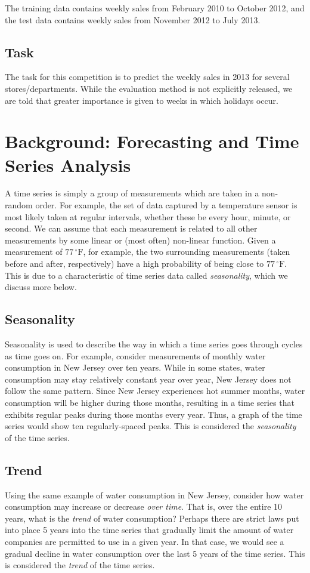 \documentclass{article}
\begin{document}
The training data contains weekly sales from February 2010 to October 2012, and the test data contains weekly sales from November 2012 to July 2013. 

\subsection{Task}
The task for this competition is to predict the weekly sales in 2013 for several stores/departments. While the evaluation method is not explicitly released, we are told that greater importance is given to weeks in which holidays occur.

\section{Background: Forecasting and Time Series Analysis}

A time series is simply a group of measurements which are taken in a non-random order. For example, the set of data captured by a temperature sensor is most likely taken at regular intervals, whether these be every hour, minute, or second. We can assume that each measurement is related to all other measurements by some linear or (most often) non-linear function. Given a measurement of $77\,^{\circ}\mathrm{F}$, for example, the two surrounding measurements (taken before and after, respectively) have a high probability of being close to $77\,^{\circ}\mathrm{F}$. This is due to a characteristic of time series data called \emph{seasonality}, which we discuss more below.

\subsection{Seasonality}
Seasonality is used to describe the way in which a time series goes through cycles as time goes on. For example, consider measurements of monthly water consumption in New Jersey over ten years. While in some states, water consumption may stay relatively constant year over year, New Jersey does not follow the same pattern. Since New Jersey experiences hot summer months, water consumption will be higher during those months, resulting in a time series that exhibits regular peaks during those months every year. Thus, a graph of the time series would show ten regularly-spaced peaks. This is considered the \emph{seasonality} of the time series.

\subsection{Trend}
Using the same example of water consumption in New Jersey, consider how water consumption may increase or decrease \emph{over time}. That is, over the entire 10 years, what is the \emph{trend} of water consumption? Perhaps there are strict laws put into place 5 years into the time series that gradually limit the amount of water companies are permitted to use in a given year. In that case, we would see a gradual decline in water consumption over the last 5 years of the time series. This is considered the \emph{trend} of the time series.
\end{document}
